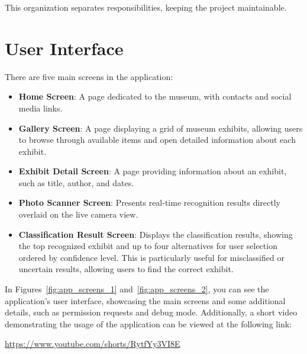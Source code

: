 This organization separates responsibilities, keeping the project maintainable.

\section{User Interface}

There are five main screens in the application:

\begin{itemize}
\item \textbf{Home Screen}: A page dedicated to the museum, with contacts and social media links.
\item \textbf{Gallery Screen}: A page displaying a grid of museum exhibits, allowing users to browse through available items and open detailed information about each exhibit.
\item \textbf{Exhibit Detail Screen}: A page providing information about an exhibit, such as title, author, and dates.
\item \textbf{Photo Scanner Screen}: Presents real-time recognition results directly overlaid on the live camera view.
\item \textbf{Classification Result Screen}: Displays the classification results, showing the top recognized exhibit and up to four alternatives for user selection ordered by confidence level. This is particularly useful for misclassified or uncertain results, allowing users to find the correct exhibit.
\end{itemize}

In Figures~\ref{fig:app_screens_1} and~\ref{fig:app_screens_2}, you can see the application's user interface, showcasing the main screens and some additional details, such as permission requests and debug mode. Additionally, a short video demonstrating the usage of the application can be viewed at the following link: 

\begin{center}
\url{https://www.youtube.com/shorts/RytfYy3VI8E}
\end{center}

